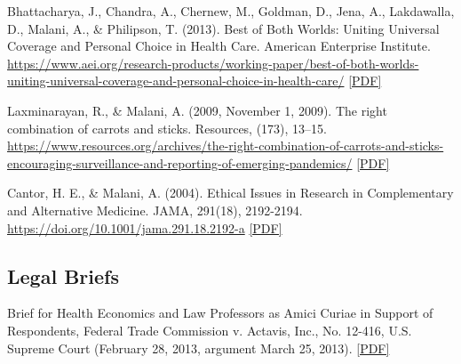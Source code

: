     \begin{tablist}

        \item[2013] \tab{}Bhattacharya, J., Chandra, A., Chernew, M., Goldman, D., Jena, A., Lakdawalla, D., Malani, A., \& Philipson, T. (2013). Best of Both Worlds: Uniting Universal Coverage and Personal Choice in Health Care. American Enterprise Institute. \href{https://www.aei.org/research-products/working-paper/best-of-both-worlds-uniting-universal-coverage-and-personal-choice-in-health-care/}{https://www.aei.org/research-products/working-paper/best-of-both-worlds-uniting-universal-coverage-and-personal-choice-in-health-care/} \href{https://github.com/anup-malani/website_personal/blob/main/publications/2013_BhattacharyaMalani_AEI_BestBothWorlds.pdf}{[PDF]}        

        \item[2009] \tab{}Laxminarayan, R., \& Malani, A. (2009, November 1, 2009). The right combination of carrots and sticks. Resources, (173), 13–15. \href{https://www.resources.org/archives/the-right-combination-of-carrots-and-sticks-encouraging-surveillance-and-reporting-of-emerging-pandemics/}{https://www.resources.org/archives/the-right-combination-of-carrots-and-sticks-encouraging-surveillance-and-reporting-of-emerging-pandemics/} \href{https://github.com/anup-malani/website_personal/blob/main/publications/2009_LaxminarayanMalani_CarrotsSticks_Pandemics.pdf}{[PDF]} 

        \item[2004] \tab{}Cantor, H. E., \& Malani, A. (2004). Ethical Issues in Research in Complementary and Alternative Medicine. JAMA, 291(18), 2192-2194. \href{https://doi.org/10.1001/jama.291.18.2192-a}{https://doi.org/10.1001/jama.291.18.2192-a} \href{https://github.com/anup-malani/website_personal/blob/main/publications/2004_MalaniCantor_JAMALetter_PlaceboEffect.pdf}{[PDF]} 

    \end{tablist}

    \subsection*{Legal Briefs}

    \begin{tablist}

        \item[2008] \tab{}Brief for Health Economics and Law Professors as Amici Curiae in Support of Respondents, Federal Trade Commission v. Actavis, Inc., No. 12-416, U.S. Supreme Court (February 28, 2013, argument March 25, 2013). \href{https://github.com/anup-malani/website_personal/blob/main/publications/2013_CowenMalani_Brief_Actavis_Brief-for-Health-Economics-and-Law-Professors.pdf}{[PDF]}
        
    \end{tablist}
    
